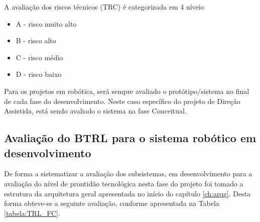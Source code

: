 A avaliação dos riscos técnicos (TRC) é categorizada em 4 níveis:
\begin{itemize}
	\item A - risco muito alto
	\item B - risco alto
	\item C - risco médio
	\item D - risco baixo
\end{itemize}

Para os projetos em robótica, será sempre avaliado o protótipo/sistema no final de cada fase do desenvolvimento. Neste caso específico do projeto de Direção Assistida, está sendo avaliado o sistema na fase Conceitual.

\subsection{Avaliação do BTRL para o sistema robótico em desenvolvimento}
De forma a sistematizar a avaliação dos subsistemas, em desenvolvimento para a avaliação do nível de prontidão tecnológica nesta fase do projeto foi tomado a estrutura da arquitetura geral apresentada no início do capítulo \ref{ch:arqg}.
Desta forma obteve-se a seguinte avaliação, conforme apresentada na Tabela \ref{tabela:TRL_FC}.

